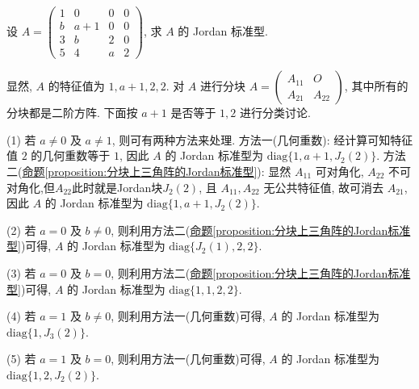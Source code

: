 \documentclass[../../main.tex]{subfiles}
\begin{document}
\begin{example}
设 $A = \begin{pmatrix}
1 & 0 & 0 & 0 \\
b & a + 1 & 0 & 0 \\
3 & b & 2 & 0 \\
5 & 4 & a & 2
\end{pmatrix}$, 求 $A$ 的 Jordan 标准型.
\end{example}
\begin{solution}
显然, $A$ 的特征值为 $1,a + 1,2,2$. 对 $A$ 进行分块 $A = \begin{pmatrix}A_{11} & O \\ A_{21} & A_{22}\end{pmatrix}$, 其中所有的分块都是二阶方阵. 下面按 $a + 1$ 是否等于 $1,2$ 进行分类讨论.

(1) 若 $a \neq 0$ 及 $a \neq 1$, 则可有两种方法来处理. {\heiti 方法一}(几何重数): 经计算可知特征值 $2$ 的几何重数等于 $1$, 因此 $A$ 的 Jordan 标准型为 $\mathrm{diag}\{1,a + 1,J_2(2)\}$. {\heiti 方法二}(\hyperref[proposition:分块上三角阵的Jordan标准型]{命题\ref{proposition:分块上三角阵的Jordan标准型}}): 显然 $A_{11}$ 可对角化, $A_{22}$ 不可对角化,但$A_{22}$此时就是Jordan块$J_2(2)$, 且 $A_{11},A_{22}$ 无公共特征值, 故可消去 $A_{21}$, 因此 $A$ 的 Jordan 标准型为 $\mathrm{diag}\{1,a + 1,J_2(2)\}$.

(2) 若 $a = 0$ 及 $b \neq 0$, 则利用{\heiti 方法二}(\hyperref[proposition:分块上三角阵的Jordan标准型]{命题\ref{proposition:分块上三角阵的Jordan标准型}})可得, $A$ 的 Jordan 标准型为 $\mathrm{diag}\{J_2(1),2,2\}$.

(3) 若 $a = 0$ 及 $b = 0$, 则利用{\heiti 方法二}(\hyperref[proposition:分块上三角阵的Jordan标准型]{命题\ref{proposition:分块上三角阵的Jordan标准型}})可得, $A$ 的 Jordan 标准型为 $\mathrm{diag}\{1,1,2,2\}$.

(4) 若 $a = 1$ 及 $b \neq 0$, 则利用{\heiti 方法一}(几何重数)可得, $A$ 的 Jordan 标准型为 $\mathrm{diag}\{1,J_3(2)\}$.

(5) 若 $a = 1$ 及 $b = 0$, 则利用{\heiti 方法一}(几何重数)可得, $A$ 的 Jordan 标准型为 $\mathrm{diag}\{1,2,J_2(2)\}$. 

\end{solution}
\end{document}
